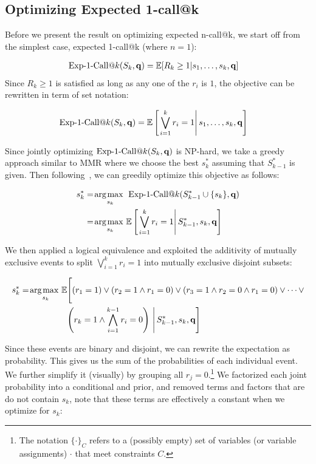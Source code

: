 \subsection{Optimizing Expected 1-call@k}
Before we present the result on optimizing expected n-call@k, we start off from the simplest case, expected 1-call@k (where $n=1$):

\begin{align}
    \ExpOneCall(S_k,\vec{q}) & = \mathbb{E}[R_k\geq 1|s_1,\dots,s_k,\vec{q}]
\end{align}
Since $R_k\geq 1$ is satisfied as long as any one of the $r_i$ is $1$, the objective can be rewritten in term of set notation:

\begin{align}
\label{eq:setRelevance}
    \ExpOneCall(S_k,\vec{q}) & = \mathbb{E} \left[\left. \bigvee_{i=1}^{k}r_i=1 \right| s_{1},\dots, s_{k},\vec{q} \right]
\end{align}

Since jointly optimizing $\ExpOneCall(S_k,\vec{q})$ is NP-hard, we
take a greedy approach similar to MMR where we choose the best $s_k^*$
assuming that $S_{k-1}^*$ is given.  Then following~\cite{chen06Less},
we can greedily optimize this objective as 
follows:

\begin{align}
s_k^* & = \argmax_{s_k} \; \ExpOneCall(S_{k-1}^* \cup \{ s_k \},\vec{q}) \nonumber \\
   & = \argmax_{s_k} \mathbb{E}\left[\left. \bigvee_{i=1}^{k} r_i=1 \right| S_{k-1}^*, s_{k},\vec{q}\right] \nonumber \\
\end{align}

We then applied a logical equivalence and exploited the additivity of
mutually exclusive events to split $\bigvee_{i=1}^{k} r_i=1$ into mutually exclusive
disjoint subsets:

\begin{align}
s_k^* & = \argmax_{s_k} \mathbb{E}\Bigg[  (r_1=1) \vee (r_2 =1 \wedge r_1=0) \vee (r_3 =1 \wedge r_2=0 \wedge r_1=0) \vee \cdots \vee \nonumber \\
   & \hspace{19mm} \left(r_k=1 \wedge \bigwedge_{i=1}^{k-1} r_i=0 \right) \, \Bigg| \, S_{k-1}^*,s_k,\vec{q} \Bigg] \label{eq:logicalsplit}
\end{align}

Since these events are binary and disjoint, we can rewrite the expectation as probability.
This gives us the sum of the probabilities of each individual event.
We further simplify it (visually) by grouping all $r_j = 0$.\footnote{The notation 
$\{ \cdot \}_C$ refers to a (possibly empty) set of 
variables (or variable assignments) $\cdot$ that meet constraints $C$.}
We factorized each joint probability into a conditional and prior, and removed terms and factors that are do not contain $s_k$, note that these terms are effectively a constant when we optimize for $s_k$:

